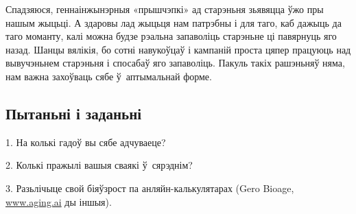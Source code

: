 Спадзяюся, геннаінжынэрныя «прышчэпкі» ад старэньня зьявяцца ўжо пры нашым жыцьці. А здаровы лад жыцьця нам патрэбны і для таго, каб дажыць да таго моманту, калі можна будзе рэальна запаволіць старэньне ці павярнуць яго назад. Шанцы вялікія, бо сотні навукоўцаў і кампаній проста цяпер працуюць над вывучэньнем старэньня і спосабаў яго запаволіць. Пакуль такіх рашэньняў няма, нам важна захоўваць сябе ў~аптымальнай форме.

\subsection*{Пытаньні і заданьні}

1. На колькі гадоў вы сябе адчуваеце?

2. Колькі пражылі вашыя сваякі ў~сярэднім?

3. Разьлічыце свой біяўзрост па анляйн-калькулятарах (Gero Bioage, \url{www.aging.ai} ды іншыя).
